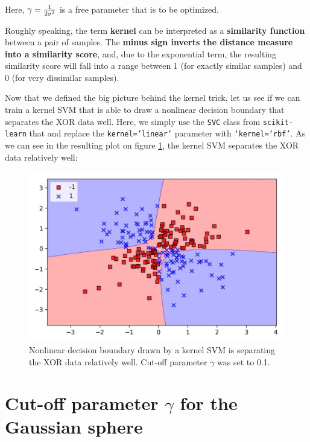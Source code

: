 \documentclass[11pt]{article}
\begin{document}
    Here, $\large{\gamma = \frac{1} {2 \sigma^2}}$ is a free parameter that is to be optimized.

    Roughly speaking, the term \textbf{kernel} can be interpreted as a \textbf{similarity function} between a pair of samples. The \textbf{minus sign inverts the distance measure into a similarity score}, and, due to the exponential term, the resulting similarity score will fall into a range between 1 (for exactly similar samples) and 0 (for very dissimilar samples).

    Now that we defined the big picture behind the kernel trick, let us see if we can train a kernel SVM that is able to draw a nonlinear decision boundary that separates the XOR data well. Here, we simply use the \texttt{SVC} class from \texttt{scikit-learn} that and replace the \texttt{kernel='linear'} parameter with \texttt{`kernel='rbf'}. As we can see in the resulting plot on figure \ref{fig:non_lin_data_svm}, the kernel SVM separates the XOR data relatively well:

    \begin{figure}[hbt!]
        \centering
        \includegraphics[width=1\linewidth,trim=4 4 4 4,clip]{svm/img/non_lin_data_svm.png}
        \caption{Nonlinear decision boundary drawn by a kernel SVM is separating the XOR data relatively well. Cut-off parameter $\gamma$ was set to 0.1.}
        \label{fig:non_lin_data_svm}
    \end{figure}

    \section{Cut-off parameter $\gamma$ for the Gaussian sphere} \label{sec:gamma}
\end{document}
